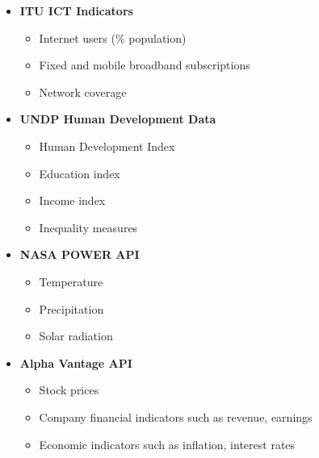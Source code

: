 \documentclass[11pt]{article}
\begin{document}
\begin{itemize}

\item \textbf{ITU ICT Indicators} 
\begin{itemize}
\item Internet users (\% population)
\item Fixed and mobile broadband subscriptions
\item Network coverage 
\end{itemize}

\item \textbf{UNDP Human Development Data} 
\begin{itemize}
\item Human Development Index 
\item Education index
\item Income index
\item Inequality measures
\end{itemize}

\item \textbf{NASA POWER API} 
\begin{itemize}
\item Temperature
\item Precipitation 
\item Solar radiation
\end{itemize}

\item \textbf{Alpha Vantage API} 
\begin{itemize}
\item Stock prices
\item Company financial indicators  such as revenue, earnings
\item Economic indicators such as inflation, interest rates
\end{itemize}

\end{itemize}
\end{document}
